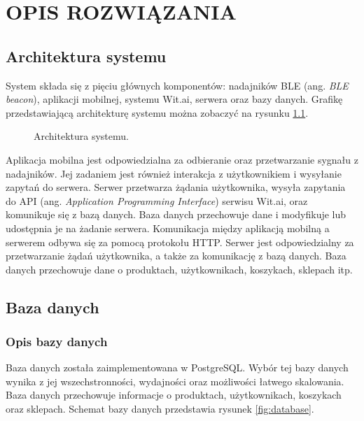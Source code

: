 \chapter{OPIS ROZWIĄZANIA}
\label{chapter:opis_rozwiazania}

\section{Architektura systemu}

System składa się z pięciu głównych komponentów: nadajników BLE (ang. \textit{BLE beacon}), aplikacji mobilnej, systemu Wit.ai, serwera oraz bazy danych. Grafikę przedstawiającą architekturę systemu można zobaczyć na rysunku \ref{fig:architecture}.

\begin{figure}[H]
    \centering
    
    \caption{Architektura systemu.}
    \label{fig:architecture}
\end{figure}

Aplikacja mobilna jest odpowiedzialna za odbieranie oraz przetwarzanie sygnału z nadajników. Jej zadaniem jest również interakcja z użytkownikiem i wysyłanie zapytań do serwera. Serwer przetwarza żądania użytkownika, wysyła zapytania do API (ang. \textit{Application Programming Interface}) serwisu Wit.ai, oraz komunikuje się z bazą danych. Baza danych przechowuje dane i modyfikuje lub udostępnia je na żadanie serwera. Komunikacja między aplikacją mobilną a serwerem odbywa się za pomocą protokołu HTTP. Serwer jest odpowiedzialny za przetwarzanie żądań użytkownika, a także za komunikację z bazą danych. Baza danych przechowuje dane o produktach, użytkownikach, koszykach, sklepach itp.

\section{Baza danych}

\subsection{Opis bazy danych}

Baza danych została zaimplementowana w PostgreSQL. Wybór tej bazy danych wynika z jej wszechstronności, wydajności oraz możliwości łatwego skalowania. Baza danych przechowuje informacje o produktach, użytkownikach, koszykach oraz sklepach. Schemat bazy danych przedstawia rysunek \ref{fig:database}.

